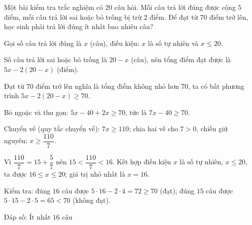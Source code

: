 \begin{problem}[9DS-BPT-006]
Một bài kiểm tra trắc nghiệm có $20$ câu hỏi. Mỗi câu trả lời đúng được cộng $5$ điểm, mỗi câu trả lời sai hoặc bỏ trống bị trừ $2$ điểm. Để đạt từ $70$ điểm trở lên, học sinh phải trả lời đúng ít nhất bao nhiêu câu?

\begin{solution}
Gọi số câu trả lời đúng là $x$ (câu), điều kiện: $x$ là số tự nhiên và $x \leq 20$.

Số câu trả lời sai hoặc bỏ trống là $20 - x$ (câu), nên tổng điểm đạt được là $5x - 2(20 - x)$ (điểm).

Đạt từ $70$ điểm trở lên nghĩa là tổng điểm không nhỏ hơn $70$, ta có bất phương trình $5x - 2(20 - x) \geq 70$.

Bỏ ngoặc và thu gọn: $5x - 40 + 2x \geq 70$, tức là $7x - 40 \geq 70$.

Chuyển vế (quy tắc chuyển vế): $7x \geq 110$; chia hai vế cho $7 > 0$, chiều giữ nguyên: $x \geq \dfrac{110}{7}$.

Vì $\dfrac{110}{7} = 15 + \dfrac{5}{7}$ nên $15 < \dfrac{110}{7} < 16$. Kết hợp điều kiện $x$ là số tự nhiên, $x \leq 20$, ta được $16 \leq x \leq 20$; giá trị nhỏ nhất là $x = 16$.

Kiểm tra: đúng $16$ câu được $5 \cdot 16 - 2 \cdot 4 = 72 \geq 70$ (đạt); đúng $15$ câu được $5 \cdot 15 - 2 \cdot 5 = 65 < 70$ (không đạt).

Đáp số: $\boxed{\text{Ít nhất } 16 \text{ câu}}$
\end{solution}
\end{problem}

